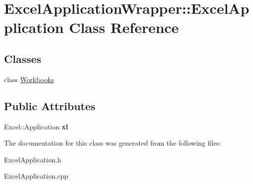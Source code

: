 \hypertarget{class_excel_application_wrapper_1_1_excel_application}{}\section{Excel\+Application\+Wrapper\+:\+:Excel\+Application Class Reference}
\label{class_excel_application_wrapper_1_1_excel_application}
\subsection*{Classes}
\begin{DoxyCompactItemize}
\item 
class \hyperlink{class_excel_application_wrapper_1_1_excel_application_1_1_workbooks}{Workbooks}
\end{DoxyCompactItemize}
\subsection*{Public Attributes}
\begin{DoxyCompactItemize}
\item 
\hypertarget{class_excel_application_wrapper_1_1_excel_application_a2c8b69990a092a3a645ea14fb16b54dd}{}Excel\+::\+Application {\bfseries xl}\label{class_excel_application_wrapper_1_1_excel_application_a2c8b69990a092a3a645ea14fb16b54dd}

\end{DoxyCompactItemize}


The documentation for this class was generated from the following files\+:\begin{DoxyCompactItemize}
\item 
Excel\+Application.\+h\item 
Excel\+Application.\+cpp\end{DoxyCompactItemize}
